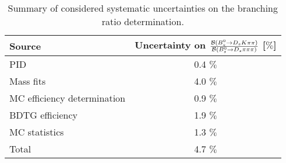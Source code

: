 \begin{table}[h!]
\centering
\begin{tabular}{l c}
Source  & Uncertainty on $\frac{\mathcal{B}({{B}^0_{s}}\rightarrow{\ensuremath{{D}_{s}}}{\ensuremath{K}}{\ensuremath{\pi}}{\ensuremath{\pi}})}{\mathcal{B}({{B}^0_{s}}\rightarrow{\ensuremath{{D}_{s}}}{\ensuremath{\pi}}{\ensuremath{\pi}}{\ensuremath{\pi}})}$ [$\%$]\\
\hline
PID & 0.4 $\%$ \\
Mass fits & 4.0 $\%$\\
MC efficiency determination & 0.9 $\%$\\
BDTG efficiency & 1.9 $\%$ \\
MC statistics & 1.3 $\%$ \\
\hline
Total & 4.7 $\%$\\
\hline
\end{tabular}
\caption{Summary of considered systematic uncertainties on the branching ratio determination.}
\label{tab: systTab}
\end{table}
